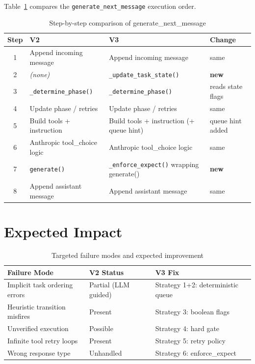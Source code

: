 \documentclass[11pt,a4paper]{article}
\begin{document}
Table~\ref{tab:loop} compares the \texttt{generate\_next\_message} execution order.

\begin{table}[h]
\centering
\caption{Step-by-step comparison of generate\_next\_message}
\label{tab:loop}
\small
\begin{tabular}{clll}
\toprule
Step & V2 & V3 & Change \\
\midrule
1 & Append incoming message & Append incoming message & same \\
2 & \emph{(none)} & \texttt{\_update\_task\_state()} & \textbf{new} \\
3 & \texttt{\_determine\_phase()} & \texttt{\_determine\_phase()} & reads state flags \\
4 & Update phase / retries & Update phase / retries & same \\
5 & Build tools + instruction & Build tools + instruction (+ queue hint) & queue hint added \\
6 & Anthropic tool\_choice logic & Anthropic tool\_choice logic & same \\
7 & \texttt{generate()} & \texttt{\_enforce\_expect()} wrapping generate() & \textbf{new} \\
8 & Append assistant message & Append assistant message & same \\
\bottomrule
\end{tabular}
\end{table}

\section{Expected Impact}

\begin{table}[h]
\centering
\caption{Targeted failure modes and expected improvement}
\label{tab:impact}
\small
\begin{tabular}{lll}
\toprule
Failure Mode & V2 Status & V3 Fix \\
\midrule
Implicit task ordering errors & Partial (LLM guided) & Strategy 1+2: deterministic queue \\
Heuristic transition misfires & Present & Strategy 3: boolean flags \\
Unverified execution & Possible & Strategy 4: hard gate \\
Infinite tool retry loops & Present & Strategy 5: retry policy \\
Wrong response type & Unhandled & Strategy 6: enforce\_expect \\
\bottomrule
\end{tabular}
\end{table}
\end{document}
